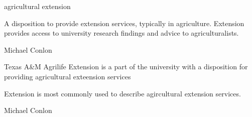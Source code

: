 \documentclass[letterpaper,10pt,english]{sphinxmanual}
\begin{document}
\begin{sphinxShadowBox}

\sphinxAtStartPar
agricultural extension
\end{sphinxShadowBox}

\begin{sphinxShadowBox}

\sphinxAtStartPar
{\hyperref[\detokenize{doc-BFO_0000016::doc}]{}}
\end{sphinxShadowBox}

\begin{sphinxShadowBox}

\sphinxAtStartPar
A disposition to provide extension services, typically in agriculture.  Extension provides access to university research findings and advice to agriculturalists.
\end{sphinxShadowBox}

\begin{sphinxShadowBox}

\sphinxAtStartPar
Michael Conlon 
\end{sphinxShadowBox}

\begin{sphinxShadowBox}

\sphinxAtStartPar
Texas A\&M Agrilife Extension is a part of the university with a disposition for providing agricultural exteension services
\end{sphinxShadowBox}

\begin{sphinxShadowBox}

\sphinxAtStartPar
Extension is most commonly used to describe agircultural extension services.
\end{sphinxShadowBox}

\begin{sphinxShadowBox}

\sphinxAtStartPar
{}
\end{sphinxShadowBox}

\begin{sphinxShadowBox}

\sphinxAtStartPar
Michael Conlon 
\end{sphinxShadowBox}
\begin{quote}

\ignorespaces \end{quote}
\end{document}
